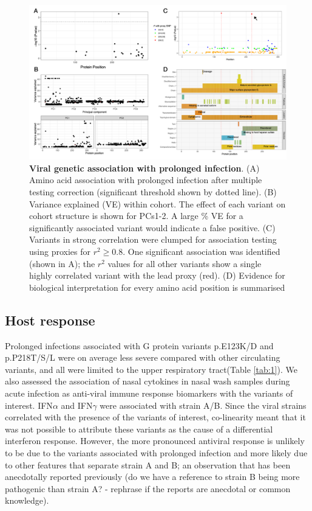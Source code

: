 \documentclass{article} %
\begin{document}
\begin{figure}[ht] \hspace{-0.5cm} 
    \includegraphics[scale=0.85]{f3}
	\caption{\textbf{Viral genetic association with prolonged infection}. (A) Amino acid association with prolonged infection after multiple testing correction (significant threshold shown by dotted line). (B) Variance explained (VE) within cohort. The effect of each variant on cohort structure is shown for PCs1-2. A large \% VE for a significantly associated variant would indicate a false positive. (C) Variants in strong correlation were clumped for association testing using proxies for $r^2 \ge 0.8$. One significant association was identified (shown in A); the $r^2$ values for all other variants show a single highly correlated variant with the lead proxy (red). 
	(D) Evidence for biological interpretation for every amino acid position is summarised}
	\label{fig:3}
\end{figure}
\clearpage

\subsection{Host response}
Prolonged infections associated with G protein variants p.E123K/D and p.P218T/S/L were on average less severe compared with other circulating variants, and all were limited to the upper respiratory tract(Table \ref{tab:1}). 
We also assessed the association of nasal cytokines in nasal wash samples during acute infection as anti-viral immune response biomarkers with the variants of interest.
IFN$\alpha$ and IFN$\gamma$ were associated with strain A/B.
Since the viral strains correlated with the presence of the variants of interest, co-linearity meant that it was not possible to attribute these variants as the cause of a differential interferon response.
However, the more pronounced antiviral response is unlikely to be due to the variants associated with prolonged infection and more likely due to other features that separate strain A and B; an observation that has been anecdotally reported previously 
(do we have a reference to strain B being more pathogenic than strain A? - rephrase if the reports are anecdotal or common knowledge). 
\end{document}
